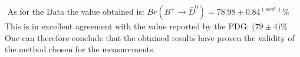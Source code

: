 
\hspace{0.1cm}  $ $ As for the Data the value obtained is:
  \hspace{0.05cm} $Br(B^+ \rightarrow \bar{D}^0) = 78.98 \pm 0.84^{(stat.)} \%$ \\
  \vspace{0.25 cm} \newline
  This is in excellent agreement with the value reported by the PDG:  ($79 \pm 4)\%$\\%
  One can therefore conclude that the obtained results have proven the validity of  the method chosen for the measurements.

